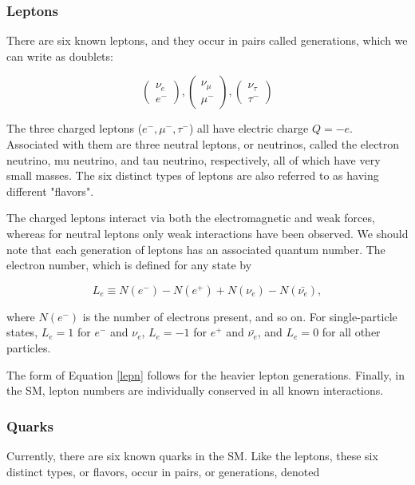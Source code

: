\subsubsection{Leptons}
There are six known leptons, and they occur in pairs called generations, which we can write as doublets:

\begin{equation}
	\begin{pmatrix}
		\nu_{e}\\
		e^{-}
	\end{pmatrix},
\begin{pmatrix}
		\nu_{\mu}\\
		\mu^{-}
	\end{pmatrix},
	\begin{pmatrix}
		\nu_{\tau}\\
		\tau^{-}
	\end{pmatrix}
\end{equation}

The three charged leptons ($e^{-}, \mu^{-},\tau^{-}$) all have electric charge $Q=-e$. Associated with them are three neutral leptons, or neutrinos, called the electron neutrino, mu neutrino, and tau neutrino, respectively, all of which have very small masses. The six distinct types of leptons are also referred to as having different "flavors". 

The charged leptons interact via both the electromagnetic and weak forces, whereas for neutral leptons only weak interactions have been observed. We should note that each generation of leptons has an associated quantum number. The electron number, which is defined for any state by

\begin{equation}
\label{lepn}
L_{e}\equiv N(e^{-}) - N(e^{+}) + N(\nu_{e}) - N(\bar{\nu_{e}}),
\end{equation}

where $N(e^{-})$ is the number of electrons present, and so on. For single-particle states, $L_{e} = 1$ for $e^{-}$ and $\nu_{e}$, $L_{e}=-1$ for $e^{+}$ and $\bar{\nu_{e}}$, and $L_{e}=0$ for all other particles.

The form of Equation \ref{lepn} follows for the heavier lepton generations. Finally, in the SM, lepton numbers are individually conserved in all known interactions.

\subsubsection{Quarks}
Currently, there are six known quarks in the SM. Like the leptons, these six distinct types, or flavors, occur in pairs, or generations, denoted

